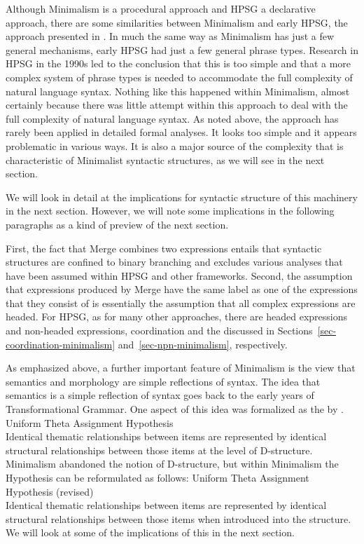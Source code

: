 \documentclass[output=paper]{langsci/langscibook}
\begin{document}
Although Minimalism is a procedural approach and HPSG a declarative approach, there are some
similarities between Minimalism and early HPSG, the approach presented in \citet{ps,ps2}. In much
the same way as Minimalism has just a few general mechanisms, early HPSG had just a few general
phrase types. Research in HPSG in the 1990s led to the conclusion that this is too simple and that a
more complex system of phrase types is needed to accommodate the full complexity of natural language
syntax. Nothing like this happened within Minimalism, almost certainly because there was little
attempt within this approach to deal with the full complexity of natural language syntax. As noted
above, the approach has rarely been applied in detailed formal analyses. It looks too simple and it
appears problematic in various ways. It is also a major source of the complexity that is
characteristic of Minimalist syntactic structures, as we will see in the next section. 

We will look in detail at the implications for syntactic structure of this machinery in the next
section. However, we will note some implications in the following paragraphs as a kind of preview of the next section.

First, the fact that Merge combines two expressions entails that syntactic structures are confined
to binary branching and excludes various analyses that have been assumed within
HPSG and other frameworks. Second, the assumption that expressions produced by Merge have the same
label as one of the expressions that they consist of \citep[]{Chomsky2008a} is essentially the assumption that all complex
expressions are headed. For HPSG, as for many other approaches, there are headed expressions and
non-headed expressions, \eg coordination and the  discussed in
Sections~\ref{sec-coordination-minimalism} and~\ref{sec-npn-minimalism}, respectively.

As emphasized above, a further important feature of Minimalism is the view that semantics and
morphology are simple reflections of syntax. The idea that semantics is a simple reflection of
syntax goes back to the early years of Transformational Grammar. One aspect of this idea was
formalized as the  by \citet[46]{Baker88a}. 
\eanoraggedright\label{ex:min-UTAH}
Uniform Theta Assignment Hypothesis\\
Identical thematic relationships between items are represented by identical structural relationships between those items at the level of D-structure.
\z
Minimalism abandoned the notion of D-structure, but within Minimalism the Hypothesis can be reformulated as follows:
\eanoraggedright\label{ex:min-UTAH-revised}
Uniform Theta Assignment Hypothesis (revised)\\
Identical thematic relationships between items are represented by identical structural relationships between those items when introduced into the structure.
\z
We will look at some of the implications of this in the next section.
\end{document}
